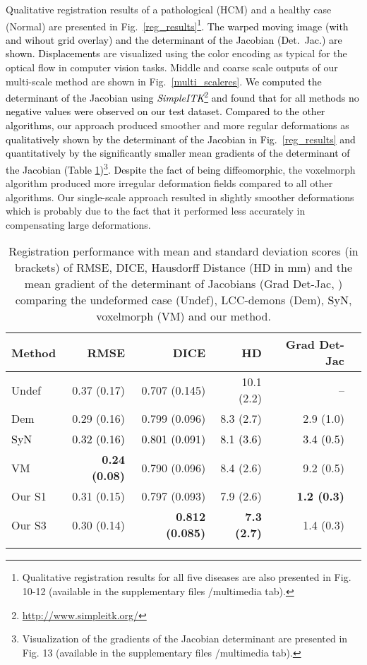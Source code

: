 \documentclass[journal]{IEEEtran}
\newcommand{\update}[1]{\textcolor{black}{#1}}
\begin{document}
Qualitative registration results of a pathological (HCM) and a healthy case (Normal) are presented in Fig.\ \ref{reg_results}\update{\footnote{Qualitative registration results for all five diseases are also presented in Fig. 10-12 (available in the supplementary files /multimedia tab).}. The warped moving image (with and wihout grid overlay) and  the determinant of the Jacobian (Det.~Jac.) are shown. Displacements} are visualized using the color encoding as typical for the optical flow in computer vision tasks. Middle and coarse scale outputs of our multi-scale method are shown in Fig.~\ref{multi_scaleres}. \update{We computed the determinant of the Jacobian using \emph{SimpleITK}\footnote{\update{\url{http://www.simpleitk.org/}}} and found that for all methods no negative values were observed on our test dataset. Compared to the other algorithms, our} approach produced smoother and more regular deformations as \update{qualitatively shown by the determinant of the Jacobian in Fig.~\ref{reg_results} and quantitatively by the significantly smaller mean gradients of the determinant of the Jacobian (Table \ref{resultTable})\update{\footnote{Visualization of the gradients of the Jacobian determinant are presented in Fig. 13 (available in the supplementary files /multimedia tab).}}. Despite the fact of being diffeomorphic}, the voxelmorph algorithm produced more irregular deformation fields compared to all other algorithms. Our single-scale approach resulted in slightly smoother deformations which is probably due to the fact that it performed less accurately in compensating large deformations. 

\begin{table}[ht]
\centering
\caption{\small{Registration performance with mean and standard deviation scores (in brackets) of RMSE, DICE, Hausdorff Distance (HD \update{in mm}) and the mean gradient of the determinant of Jacobians (Grad Det-Jac, ) comparing the undeformed case (Undef), LCC-demons (Dem), \update{SyN}, voxelmorph (VM) and our method.}}\label{resultTable}
\begin{tabular}{l|rrrrr}
Method & RMSE & DICE & HD & Grad Det-Jac \\
\hline
Undef & 0.37 (0.17) & 0.707 (0.145) & 10.1 (2.2) & --\\ Dem & 0.29 (0.16) & 0.799 (0.096) & 8.3 (2.7) & 2.9 (1.0) \\ \update{SyN} & \update{0.32 (0.16)} &\update{0.801 (0.091)} & \update{8.1 (3.6)} &\update{3.4 (0.5)} \\
VM & \bf{0.24 (0.08)} & 0.790 (0.096) & 8.4 (2.6) & 9.2 (0.5) \\ Our S1 & 0.31 (0.15) & 0.797 (0.093) & 7.9 (2.6) & \bf{1.2 (0.3)} \\ Our S3 & 0.30 (0.14) & \bf{0.812 (0.085)} & \bf{7.3 (2.7)} & 1.4 (0.3)\\ \noalign{\smallskip}
\hline
\end{tabular}
\end{table}
\end{document}
